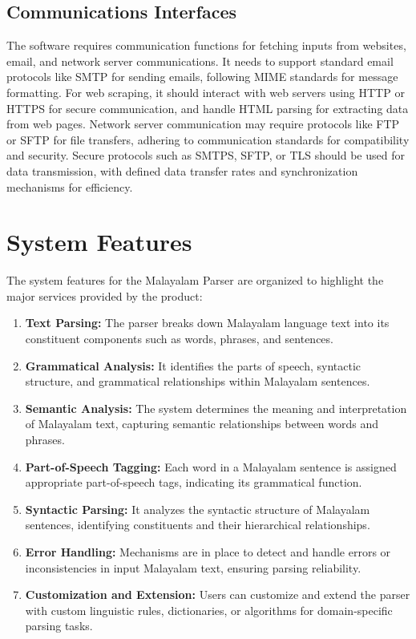 \documentclass[12pt]{article}
\begin{document}
	\subsection{Communications Interfaces}
	The software requires communication functions for fetching inputs from websites, email,
	and network server communications. It needs to support standard email protocols like
	SMTP for sending emails, following MIME standards for message formatting. For web
	scraping, it should interact with web servers using HTTP or HTTPS for secure
	communication, and handle HTML parsing for extracting data from web pages. Network
	server communication may require protocols like FTP or SFTP for file transfers, adhering
	to communication standards for compatibility and security. Secure protocols such as
	SMTPS, SFTP, or TLS should be used for data transmission, with defined data transfer
	rates and synchronization mechanisms for efficiency.
	
	\section{System Features}
	The system features for the Malayalam Parser are organized to highlight the major services provided by the product:
	\begin{enumerate}
		\item \textbf{Text Parsing:} The parser breaks down Malayalam language text into its constituent
		components such as words, phrases, and sentences.
		\item \textbf{Grammatical Analysis:} It identifies the parts of speech, syntactic structure, and
		grammatical relationships within Malayalam sentences.
		\item \textbf{Semantic Analysis:} The system determines the meaning and interpretation of
		Malayalam text, capturing semantic relationships between words and phrases.
		\item \textbf{Part-of-Speech Tagging:} Each word in a Malayalam sentence is assigned
		appropriate part-of-speech tags, indicating its grammatical function.
		\item \textbf{Syntactic Parsing:} It analyzes the syntactic structure of Malayalam sentences,
		identifying constituents and their hierarchical relationships.
		\item \textbf{Error Handling:} Mechanisms are in place to detect and handle errors or
		inconsistencies in input Malayalam text, ensuring parsing reliability.
		\item \textbf{Customization and Extension:} Users can customize and extend the parser with
		custom linguistic rules, dictionaries, or algorithms for domain-specific parsing tasks.
	\end{enumerate}
\end{document}
